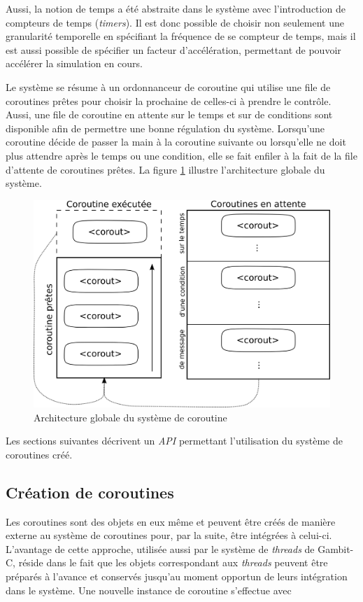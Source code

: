 \documentclass[12pt,oneside,letterpaper,francais]{book}
\begin{document}
Aussi, la notion de temps a été abstraite dans le système avec
l'introduction de compteurs de temps (\textit{timers}). Il est donc
possible de choisir non seulement une granularité temporelle en
spécifiant la fréquence de se compteur de temps, mais il est aussi
possible de spécifier un facteur d'accélération, permettant de pouvoir
accélérer la simulation en cours.

Le système se résume à un ordonnanceur de coroutine qui utilise une
file de coroutines prêtes pour choisir la prochaine de celles-ci à
prendre le contrôle. Aussi, une file de coroutine en attente sur le
temps et sur de conditions sont disponible afin de permettre une bonne
régulation du système. Lorsqu'une coroutine décide de passer la main à
la coroutine suivante ou lorsqu'elle ne doit plus attendre après le
temps ou une condition, elle se fait enfiler à la fait de la file
d'attente de coroutines prêtes. La figure \ref{Corout:system-schema}
illustre l'architecture globale du système.

\begin{figure}[htb!]
  \center
  \includegraphics[scale=0.7]{corout-system}
  \caption{Architecture globale du système de coroutine}
  \label{Corout:system-schema}
\end{figure}

 Les sections suivantes décrivent un \textit{API} permettant
l'utilisation du système de coroutines créé.


\subsection{Création de coroutines}
Les coroutines sont des objets en eux même et peuvent être créés de
manière externe au système de coroutines pour, par la suite, être
intégrées à celui-ci. L'avantage de cette approche, utilisée aussi par
le système de \textit{threads} de Gambit-C, réside dans le fait que
les objets correspondant aux \textit{threads} peuvent être préparés à
l'avance et conservés jusqu'au moment opportun de leurs intégration
dans le système. Une nouvelle instance de coroutine s'effectue avec
\end{document}
